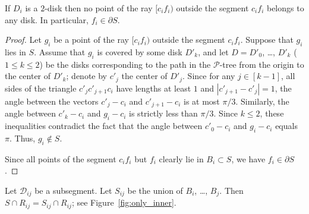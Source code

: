\begin{observation}
If $D_i$ is a $2$-disk then no point of the ray $[c_if_i)$ outside the segment $c_if_i$ belongs to any disk. In particular, $f_i\in\partial S$.
\label{lemma:far}
\end{observation}

\begin{proof}
Let $g_i$ be a point of the ray $[c_if_i)$ outside the segment $c_if_i$. Suppose that $g_i$ lies in $S$.
Assume that $g_i$ is covered by some disk $D'_k$, and let $D = D'_0$, \ldots, $D'_k$ ($1\leq k\leq 2$) be the disks corresponding to the path in the $\mathcal{P}$-tree from the origin to the center of $D'_k$; denote by $c'_j$ the center of $D'_j$.
Since for any $j\in[k - 1]$, all sides of the triangle $c'_jc'_{j+1}c_i$ have lengths at least $1$ and $|c'_{j+1} - c'_j| = 1$, the angle between the vectors $c'_j - c_i$ and $c'_{j+1} - c_i$ is at most $\pi/3$. Similarly, the angle between $c'_k - c_i$ and $g_i - c_i$ is strictly less than $\pi/3$. Since $k\leq 2$, these inequalities contradict the fact that the angle between $c'_0 - c_i$ and $g_i - c_i$ equals $\pi$. Thus, $g_i\notin S$.

Since all points of the segment $c_if_i$ but $f_i$ clearly lie in $B_i\subset S$, we have $f_i\in\partial{S}$.
\end{proof}


\begin{observation}
Let $\mathcal{D}_{ij}$ be a subsegment. Let $S_{ij}$ be the union of $B_i$, \ldots, $B_j$. Then $S\cap R_{ij} = S_{ij}\cap R_{ij}$; see Figure~\ref{fig:only_inner}.

\label{lemma:only_inner}
\end{observation}

